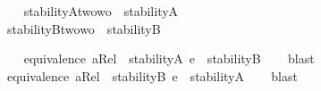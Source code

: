 \begin{isabellebody}
\begin{isamarkuptext}%
%
\end{isamarkuptext}\isamarkuptrue%
\ \ \isamarkupfalse%
\ stabilityA{\isacharcolon}{\isacharcolon}{\isachardoublequoteopen}{\isacharparenleft}{\isacharprime}t{\isasymRightarrow}wo{\isacharparenright}{\isasymRightarrow}wo{\isachardoublequoteclose}\ \ {\isachardoublequoteopen}stabilityA\ {\isasymtau}\ {\isasymequiv}\ \isactrlbold {\isasymforall}{\isasymalpha}{\isachardot}\ {\isacharparenleft}{\isasymtau}\ {\isasymalpha}{\isacharparenright}\ \isactrlbold {\isasymrightarrow}\ \isactrlbold {\isasymbox}{\isacharparenleft}{\isasymtau}\ {\isasymalpha}{\isacharparenright}{\isachardoublequoteclose}\isanewline
\ \ \isamarkupfalse%
\ stabilityB{\isacharcolon}{\isacharcolon}{\isachardoublequoteopen}{\isacharparenleft}{\isacharprime}t{\isasymRightarrow}wo{\isacharparenright}{\isasymRightarrow}wo{\isachardoublequoteclose}\ \ {\isachardoublequoteopen}stabilityB\ {\isasymtau}\ {\isasymequiv}\ \isactrlbold {\isasymforall}{\isasymalpha}{\isachardot}\ \isactrlbold {\isasymdiamond}{\isacharparenleft}{\isasymtau}\ {\isasymalpha}{\isacharparenright}\ \isactrlbold {\isasymrightarrow}\ {\isacharparenleft}{\isasymtau}\ {\isasymalpha}{\isacharparenright}{\isachardoublequoteclose}%
\begin{isamarkuptext}%
%
\end{isamarkuptext}\isamarkuptrue%
\ \ \isamarkupfalse%
\ {\isachardoublequoteopen}equivalence\ aRel\ {\isasymLongrightarrow}\ {\isasymlfloor}stabilityA\ {\isacharparenleft}{\isasymtau}{\isacharcolon}{\isacharcolon}{\isasymup}{\isasymlangle}e{\isasymrangle}{\isacharparenright}{\isasymrfloor}\ {\isasymlongrightarrow}\ {\isasymlfloor}stabilityB\ {\isasymtau}{\isasymrfloor}{\isachardoublequoteclose}%
\ %
%
\isamarkupfalse%
\ blast%
%
%
\ \ \ \ \isanewline
\ \ \isamarkupfalse%
\ {\isachardoublequoteopen}equivalence\ aRel\ {\isasymLongrightarrow}\ {\isasymlfloor}stabilityB\ {\isacharparenleft}{\isasymtau}{\isacharcolon}{\isacharcolon}{\isasymup}{\isasymlangle}e{\isasymrangle}{\isacharparenright}{\isasymrfloor}\ {\isasymlongrightarrow}\ {\isasymlfloor}stabilityA\ {\isasymtau}{\isasymrfloor}{\isachardoublequoteclose}%
\ %
%
\isamarkupfalse%
\ blast%
%
%
%
\begin{isamarkuptext}%

\end{isamarkuptext}
\end{isabellebody}
